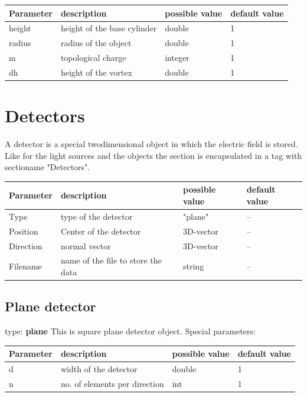 \documentclass[a4paper,html,11pt,openany]{book}
\begin{document}
\vspace{1em}
\begin{tabular}{p{2cm}|m{3.5cm}|m{3.0cm}|p{1.7cm}}
 Parameter  & description  & possible value & default value\\
 \hline
 height & height of the base cylinder & double & 1 \\
 \hline
 radius & radius of the object & double & 1 \\
 \hline
 m & topological charge & integer & 1\\
 \hline
 dh & height of the vortex & double & 1 \\
 \end{tabular}
 
 \section{Detectors}
 A detector is a special twodimensional object in which the electric field is stored. Like for the light sources and the objects the section is encapsulated in a tag with sectioname "Detectors". 
  
 \vspace{1em} 
\begin{tabular}{p{2cm}|m{3.5cm}|m{3.0cm}|p{1.7cm}}
 Parameter  & description  & possible value & default value\\
 \hline 
 Type & type of the detector & "plane" & -- \\
 \hline
 Position & Center of the detector & 3D-vector & -- \\
 \hline
 Direction & normal vector & 3D-vector & -- \\
 \hline  
 Filename & name of the file to store the data & string & -- \\
  \end{tabular}
  
 \subsection{Plane detector}
 type: \textbf{plane}
 This is square plane detector object. \newline
 Special parameters: 
 
 \vspace{1em} 
\begin{tabular}{p{2cm}|m{3.5cm}|m{3.0cm}|p{1.7cm}}
 Parameter  & description  & possible value & default value\\
 \hline 
d & width of the detector & double & 1 \\
\hline
n & no. of elements per direction & int & 1 \\ 
\end{tabular}
 
\end{document}
